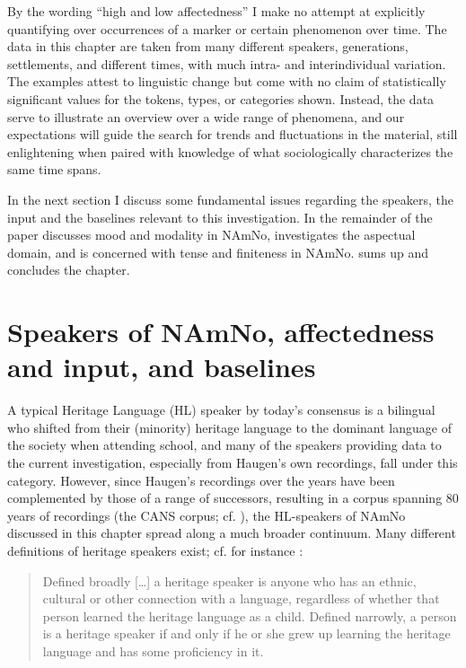 \documentclass[output=paper]{langscibook}
\begin{document}
By the wording “high and low affectedness” I make no attempt at explicitly quantifying over occurrences of a marker or certain phenomenon over time. The data in this chapter are taken from many different speakers, generations, settlements, and different times, with much intra- and interindividual variation. The examples attest to linguistic change but come with no claim of statistically significant values for the tokens, types, or categories shown. Instead, the data serve to illustrate an overview over a wide range of phenomena, and our expectations will guide the search for trends and fluctuations in the material, still enlightening when paired with knowledge of what sociologically characterizes the same time spans. 

In the next section I discuss some fundamental issues regarding the speakers, the input and the baselines relevant to this investigation. In the remainder of the paper  discusses mood and modality in NAmNo,  investigates the aspectual domain, and  is concerned with tense and finiteness in NAmNo.  sums up and concludes the chapter. 

\section{Speakers of NAmNo, affectedness and input, and baselines}\label{sec:eide:2}

A typical Heritage Language (HL) speaker by today’s consensus is a bilingual who shifted from their (minority) heritage language to the dominant language of the society when attending school, and many of the speakers providing data to the current investigation, especially from Haugen’s own recordings, fall under this category. However, since Haugen’s recordings over the years have been complemented by those of a range of successors, resulting in a corpus spanning 80 years of recordings (the CANS corpus; cf. ), the HL-speakers of NAmNo discussed in this chapter spread along a much broader continuum. Many different definitions of heritage speakers exist; cf. for instance \citet[260]{BenmamounEtAl2013}:

\begin{quote}
Defined broadly […] a heritage speaker is anyone who has an ethnic, cultural or other connection with a language, regardless of whether that person learned the heritage language as a child. Defined narrowly, a person is a heritage speaker if and only if he or she grew up learning the heritage language and has some proficiency in it.
\end{quote}
\end{document}
